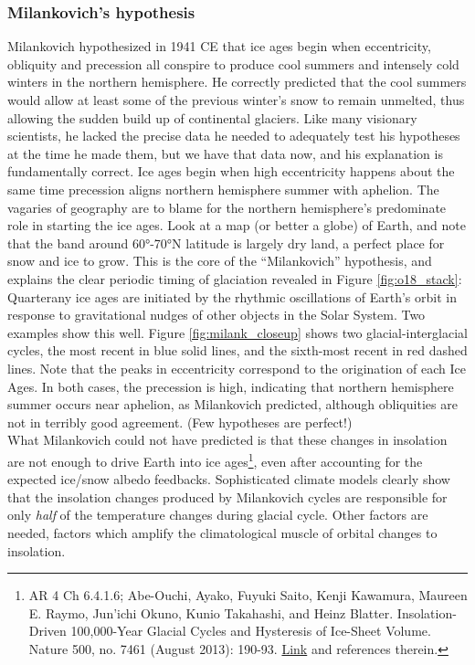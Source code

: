 \subsubsection{Milankovich's hypothesis}
Milankovich hypothesized in 1941 CE that ice ages begin when eccentricity, obliquity and precession all conspire to produce cool summers and intensely cold winters in the northern hemisphere. He correctly predicted that the cool summers would allow at least some of the previous winter's snow to remain unmelted, thus allowing the sudden build up of continental glaciers. Like many visionary scientists, he lacked the precise data he needed to adequately test his hypotheses at the time he made them, but we have that data now, and his explanation is fundamentally correct. Ice ages begin when high eccentricity happens about the same time precession aligns northern hemisphere summer with aphelion. The vagaries of geography are to blame for the northern hemisphere's predominate role in starting the ice ages. Look at a map (or better a globe) of Earth, and note that the band around \ang{60}-\ang{70}N latitude is largely dry land, a perfect place for snow and ice to grow. This is the core of the ``Milankovich'' hypothesis, and explains the clear periodic timing of glaciation revealed in Figure \ref{fig:o18_stack}: Quarterany ice ages are initiated by the rhythmic oscillations of Earth's orbit in response to gravitational nudges of other objects in the Solar System.  Two examples show this well. Figure \ref{fig:milank_closeup} shows two glacial-interglacial cycles, the most recent in blue solid lines, and the sixth-most recent in red dashed lines. Note that the peaks in eccentricity correspond to the origination of each Ice Ages. In both cases, the precession is high, indicating that northern hemisphere summer occurs near aphelion, as Milankovich predicted, although obliquities are not in terribly good agreement. (Few hypotheses are perfect!)\\

What Milankovich could not have predicted is that these changes in insolation are not enough to drive Earth into ice ages\footnote{AR 4 Ch 6.4.1.6; Abe-Ouchi, Ayako, Fuyuki Saito, Kenji Kawamura, Maureen E. Raymo, Jun'ichi Okuno, Kunio Takahashi, and Heinz Blatter. Insolation-Driven 100,000-Year Glacial Cycles and Hysteresis of Ice-Sheet Volume. Nature 500, no. 7461 (August 2013): 190-93. \href{https://doi.org/10.1038/nature12374}{Link} and references therein.}, even after accounting for the expected ice/snow albedo feedbacks. Sophisticated climate models clearly show that the insolation changes produced by Milankovich cycles are responsible for only \emph{half} of the temperature changes during  glacial cycle. Other factors are needed, factors which amplify the climatological muscle of orbital changes to insolation.\\
	
